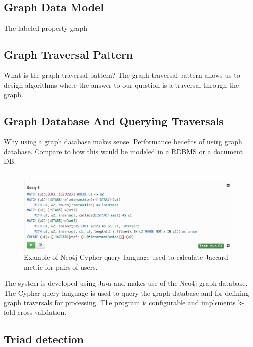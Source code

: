 \subsection{Graph Data Model}
The labeled property graph

\subsection{Graph Traversal Pattern}
What is the graph traversal pattern? The graph traversal pattern allows us to design algorithms where the answer to our question is a traversal through the graph. 

\subsection{Graph Database And Querying Traversals}
Why using a graph database makes sense.
Performance benefits of using graph database.
Compare to how this would be modeled in a RDBMS or a document DB.
\subsection{}
\begin{figure}[ht]
\vskip 0.2in
\begin{center}
\centerline{\includegraphics[width=\columnwidth]{images/jaccard.png}}
\caption{Example of Neo4j Cypher query language used to calculate Jaccard metric for pairs of users.}
\label{icml-historical}
\end{center}
\vskip -0.2in
\end{figure} 
The system is developed using Java and makes use of the Neo4j graph database. The Cypher query language is used to query the graph database and for defining graph traversals for processing. The program is configurable and implements k-fold cross validation.

\subsection{Triad detection}

